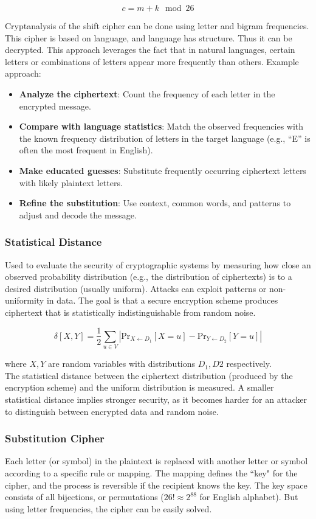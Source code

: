 \[ c = m + k \mod 26 \]

Cryptanalysis of the shift cipher can be done using letter and bigram frequencies. This cipher is based on language, and language has structure. Thus it can be decrypted.  This approach leverages the fact that in natural languages, certain letters or combinations of letters appear more frequently than others. Example approach:
\begin{itemize}
    \item \textbf{Analyze the ciphertext}: Count the frequency of each letter in the encrypted message.
    \item \textbf{Compare with language statistics}: Match the observed frequencies with the known frequency distribution of letters in the target language (e.g., ``E'' is often the most frequent in English).
    \item \textbf{Make educated guesses}: Substitute frequently occurring ciphertext letters with likely plaintext letters.
    \item \textbf{Refine the substitution}: Use context, common words, and patterns to adjust and decode the message.
\end{itemize}

\subsubsection{Statistical Distance}
Used to evaluate the security of cryptographic systems by measuring how close an observed probability distribution (e.g., the distribution of ciphertexts) is to a desired distribution (usually uniform). Attacks can exploit patterns or non-uniformity in data. The goal is that a secure encryption scheme produces ciphertext that is statistically indistinguishable from random noise.

\[ \delta[X,Y] = \frac{1}{2}\sum_{u\in V} \left| \text{Pr}_{X \leftarrow D_1}[X = u]  - \text{Pr}_{Y \leftarrow D_2}[Y = u]  \right| \]

where $X, Y$ are random variables with distributions $D_1, D2$ respectively. \\

The statistical distance between the ciphertext distribution (produced by the encryption scheme) and the uniform distribution is measured. A smaller statistical distance implies stronger security, as it becomes harder for an attacker to distinguish between encrypted data and random noise.

\subsubsection{Substitution Cipher}
Each letter (or symbol) in the plaintext is replaced with another letter or symbol according to a specific rule or mapping. The mapping defines the ``key" for the cipher, and the process is reversible if the recipient knows the key.
The key space consists of all bijections, or permutations ($26! \approx 2^{88}$ for English alphabet). But using letter frequencies, the cipher can be easily solved. \\

